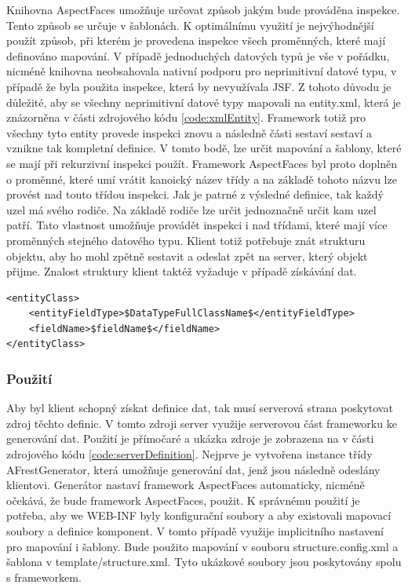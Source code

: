 Knihovna AspectFaces umožňuje určovat způsob jakým bude prováděna inspekce. Tento způsob se určuje v šablonách. K optimálnímu využití je nejvýhodnější použít způsob, při kterém je provedena inspekce všech proměnných, které mají definováno mapování. V případě jednoduchých datových typů je vše v pořádku, nicméně knihovna neobsahovala nativní podporu pro neprimitivní datové typu, v případě že byla použita inspekce, která by nevyužívala JSF. Z tohoto důvodu je důležité, aby se všechny neprimitivní datové typy mapovali na entity.xml, která je znázorněna v části zdrojového kódu \ref{code:xmlEntity}. Framework totiž pro všechny tyto entity provede inspekci znovu a následně části sestaví sestaví a vznikne tak kompletní definice. V tomto bodě, lze určit mapování a šablony, které se mají při rekurzivní inspekci použít. Framework AspectFaces byl proto doplněn o proměnné, které umí vrátit kanoický název třídy a na základě tohoto názvu lze provést nad touto třídou inspekci. Jak je patrné z výsledné definice, tak každý uzel má svého rodiče. Na základě rodiče lze určit jednoznačně určit kam uzel patří. Tato vlastnost umožňuje provádět inspekci i nad třídami, které mají více proměnných stejného datového typu. Klient totiž potřebuje znát strukturu objektu, aby ho mohl zpětně sestavit a odeslat zpět na server, který objekt přijme. Znalost struktury klient taktéž vyžaduje v případě získávání dat.
\begin{lstlisting}[caption=Ukázka definice neprimitvního datového typu,
  label={code:xmlEntity}]
<entityClass>
	<entityFieldType>$DataTypeFullClassName$</entityFieldType>
	<fieldName>$fieldName$</fieldName>
</entityClass>
\end{lstlisting}
\subsubsection{Použití}
Aby byl klient schopný získat definice dat, tak musí serverová strana poskytovat zdroj těchto definic. V tomto zdroji server využije serverovou část frameworku ke generování dat. Použití je přímočaré a ukázka zdroje je zobrazena na v části zdrojového kódu \ref{code:serverDefinition}. Nejprve je vytvořena instance třídy AFrestGenerator, která umožňuje generování dat, jenž jsou následně odeslány klientovi. Generátor nastaví framework AspectFaces automaticky, nicméně očekává, že bude framework AspectFaces, použit. K správnému použití je potřeba, aby we WEB-INF byly konfigurační soubory a aby existovali mapovací soubory a definice komponent. V tomto případě využije implicitního nastavení pro mapování i šablony. Bude použito mapování v souboru structure.config.xml a šablona v template/structure.xml. Tyto ukázkové soubory jsou poskytovány spolu s frameworkem.


